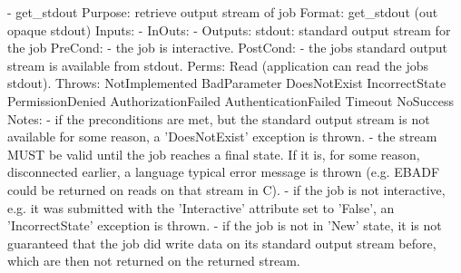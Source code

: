 \begin{myspec}
 
    - get_stdout
      Purpose:  retrieve output stream of job
      Format:   get_stdout         (out opaque stdout)
      Inputs:   -
      InOuts:   -
      Outputs:  stdout:             standard output stream for
                                    the job
      PreCond:  - the job is interactive.
      PostCond: - the jobs standard output stream is available 
                  from stdout.
      Perms:    Read (application can read the jobs stdout).
      Throws:   NotImplemented
                BadParameter
                DoesNotExist
                IncorrectState
                PermissionDenied
                AuthorizationFailed
                AuthenticationFailed
                Timeout
                NoSuccess
      Notes:    - if the preconditions are met, but the standard
                  output stream is not available for some 
                  reason, a 'DoesNotExist' exception is thrown.
                - the stream MUST be valid until the job reaches
                  a final state.  If it is, for some reason,
                  disconnected earlier, a language typical error
                  message is thrown (e.g. EBADF could be 
                  returned on reads on that stream in C).
                - if the job is not interactive, e.g. it was
                  submitted with the 'Interactive' attribute set
                  to 'False', an 'IncorrectState' exception is
                  thrown.
                - if the job is not in 'New' state, it is not
                  guaranteed that the job did write data on
                  its standard output stream before, which are
                  then not returned on the returned stream.
 

\end{myspec}

